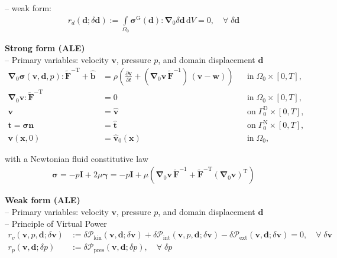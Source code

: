 \documentclass[a4paper,12pt]{report}
\newcommand{\bs}[1]{\boldsymbol{#1}}
\newcommand{\Om}{\mathit{\Omega}}
\newcommand{\Gm}{\mathit{\Gamma}}
\begin{document}
-- weak form:
\begin{equation}
\label{equation-ale-weak-form}
\begin{aligned}
r_{d}(\bs{d};\delta\bs{d}) := \int\limits_{\Om_0}\bs{\sigma}^{\mathrm{G}}(\bs{d}) : \bs{\nabla}_{0}\delta\bs{d}\,\mathrm{d}V = 0, \quad \forall \; \delta\bs{d}
\end{aligned}
\end{equation}


\textbf{Strong form (ALE)}\\

-- Primary variables: velocity $\bs{v}$, pressure $p$, and domain displacement $\bs{d}$
\begin{equation}
\label{equation-fluid-ale-strong-form}
\begin{aligned}
\bs{\nabla}_{0} \bs{\sigma}(\bs{v},\bs{d},p) : \widetilde{\bs{F}}^{-\mathrm{T}} + \hat{\bs{b}} &= \rho\left(\frac{\partial\bs{v}}{\partial t} + (\bs{\nabla}_0\bs{v}\,\widetilde{\bs{F}}^{-1})\,(\bs{v}-\bs{w})\right) &&\text{in} \; \mathit{\Om}_0 \times [0, T],\\
\bs{\nabla}_{0}\bs{v} : \widetilde{\bs{F}}^{-\mathrm{T}} &= 0 &&\text{in} \; \mathit{\Om}_0 \times [0, T],\\
\bs{v} &= \hat{\bs{v}} &&\text{on} \; \mathit{\Gm}_0^{\mathrm{D}} \times [0, T], \\
\bs{t} = \bs{\sigma}\bs{n} &= \hat{\bs{t}} &&\text{on} \; \mathit{\Gm}_0^{\mathrm{N}} \times [0, T], \\
\bs{v}(\bs{x},0) &= \hat{\bs{v}}_{0}(\bs{x}) &&\text{in} \; \mathit{\Om}_0,
\end{aligned}
\end{equation}

with a Newtonian fluid constitutive law
\begin{align}
\bs{\sigma} = -p \bs{I} + 2 \mu \bs{\gamma} = -p \bs{I} + \mu \left(\bs{\nabla}_0 \bs{v}\,\widetilde{\bs{F}}^{-1} + \widetilde{\bs{F}}^{-\mathrm{T}}(\bs{\nabla}_0 \bs{v})^{\mathrm{T}}\right)
\end{align}

\textbf{Weak form (ALE)}\\

-- Primary variables: velocity $\bs{v}$, pressure $p$, and domain displacement $\bs{d}$\\

-- Principle of Virtual Power
\begin{equation}
\label{equation-fluid-ale-weak-form}
\begin{aligned}
r_v(\bs{v},p,\bs{d};\delta\bs{v}) &:= \delta \mathcal{P}_{\mathrm{kin}}(\bs{v},\bs{d};\delta\bs{v}) + \delta \mathcal{P}_{\mathrm{int}}(\bs{v},p,\bs{d};\delta\bs{v}) - \delta \mathcal{P}_{\mathrm{ext}}(\bs{v},\bs{d};\delta\bs{v}) = 0, \quad \forall \; \delta\bs{v} \\
r_p(\bs{v},\bs{d};\delta p) &:= \delta \mathcal{P}_{\mathrm{pres}}(\bs{v},\bs{d};\delta p), \quad \forall \; \delta p
\end{aligned}
\end{equation}
\end{document}
